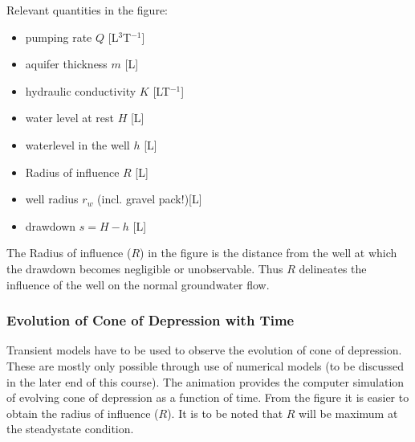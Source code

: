 \documentclass[letterpaper,10pt,english]{jupyterBook}
\begin{document}
\sphinxAtStartPar
Relevant quantities in the figure:
\begin{itemize}
\item {} 
\sphinxAtStartPar
pumping rate \(Q\) {[}L\(^3\)T\(^{-1}\){]}

\end{itemize}
\begin{itemize}
\item {} 
\sphinxAtStartPar
aquifer thickness \(m\) {[}L{]}

\end{itemize}
\begin{itemize}
\item {} 
\sphinxAtStartPar
hydraulic conductivity \(K\) {[}LT\(^{-1}\){]}

\end{itemize}
\begin{itemize}
\item {} 
\sphinxAtStartPar
water level at rest \(H\) {[}L{]}

\end{itemize}
\begin{itemize}
\item {} 
\sphinxAtStartPar
water\sphinxhyphen{}level in the well \(h\) {[}L{]}

\end{itemize}
\begin{itemize}
\item {} 
\sphinxAtStartPar
Radius of influence \(R\) {[}L{]}

\end{itemize}
\begin{itemize}
\item {} 
\sphinxAtStartPar
well radius \(r_w\) (incl. gravel pack!){[}L{]}

\end{itemize}
\begin{itemize}
\item {} 
\sphinxAtStartPar
drawdown \(s = H - h\) {[}L{]}

\end{itemize}

\sphinxAtStartPar
The Radius of influence (\(R\)) in the figure is the distance from the well at which the drawdown becomes negligible or unobservable. Thus \(R\) delineates the influence of the well on the normal groundwater flow.


\subsubsection{Evolution of Cone of Depression with Time}
\label{\detokenize{content/flow/L8/18_wells:evolution-of-cone-of-depression-with-time}}
\sphinxAtStartPar
Transient models have to be used to observe the evolution of cone of depression. These are mostly only possible through use of numerical models (to be discussed in the later end of this course). The animation provides the computer simulation of evolving cone of depression as a function of time. From the figure it is easier to obtain the radius of influence (\(R\)). It is to be noted that \(R\) will be maximum at the steady\sphinxhyphen{}state condition.
\end{document}
